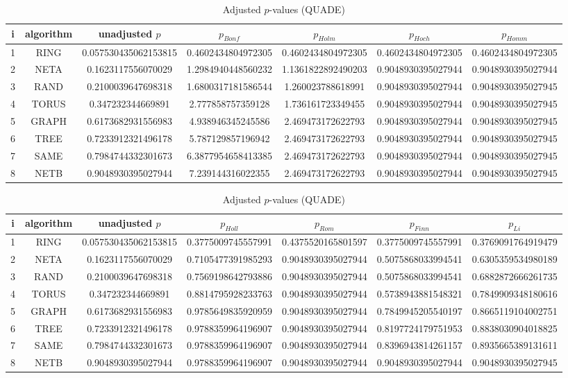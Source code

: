 \documentclass[a4paper,10pt]{article}
\begin{document}
\begin{landscape}
\newpage

\begin{table}[!htp]
\centering\scriptsize
\caption{Adjusted $p$-values (QUADE)}
\begin{tabular}{ccccccc}
i&algorithm&unadjusted $p$&$p_{Bonf}$&$p_{Holm}$&$p_{Hoch}$&$p_{Homm}$\\
\hline
1& RING&0.057530435062153815&0.4602434804972305&0.4602434804972305&0.4602434804972305&0.4602434804972305\\
2& NETA&0.1623117556070029&1.2984940448560232&1.1361822892490203&0.9048930395027944&0.9048930395027944\\
3& RAND&0.2100039647698318&1.6800317181586544&1.260023788618991&0.9048930395027944&0.9048930395027945\\
4& TORUS&0.347232344669891&2.777858757359128&1.736161723349455&0.9048930395027944&0.9048930395027945\\
5& GRAPH&0.6173682931556983&4.938946345245586&2.469473172622793&0.9048930395027944&0.9048930395027945\\
6& TREE&0.7233912321496178&5.787129857196942&2.469473172622793&0.9048930395027944&0.9048930395027945\\
7& SAME&0.7984744332301673&6.3877954658413385&2.469473172622793&0.9048930395027944&0.9048930395027945\\
8& NETB&0.9048930395027944&7.239144316022355&2.469473172622793&0.9048930395027944&0.9048930395027945\\
\hline
\end{tabular}
\end{table}

\begin{table}[!htp]
\centering\scriptsize
\caption{Adjusted $p$-values (QUADE)}
\begin{tabular}{ccccccc}
i&algorithm&unadjusted $p$&$p_{Holl}$&$p_{Rom}$&$p_{Finn}$&$p_{Li}$\\
\hline
1& RING&0.057530435062153815&0.3775009745557991&0.4375520165801597&0.3775009745557991&0.3769091764919479\\
2& NETA&0.1623117556070029&0.7105477391985293&0.9048930395027944&0.5075868033994541&0.6305359534980189\\
3& RAND&0.2100039647698318&0.7569198642793886&0.9048930395027944&0.5075868033994541&0.6882872666261735\\
4& TORUS&0.347232344669891&0.8814795928233763&0.9048930395027944&0.5738943881548321&0.7849909348180616\\
5& GRAPH&0.6173682931556983&0.9785649835920959&0.9048930395027944&0.7849945205540197&0.8665119104002751\\
6& TREE&0.7233912321496178&0.9788359964196907&0.9048930395027944&0.8197724179751953&0.8838030904018825\\
7& SAME&0.7984744332301673&0.9788359964196907&0.9048930395027944&0.8396943814261157&0.8935665389131611\\
8& NETB&0.9048930395027944&0.9788359964196907&0.9048930395027944&0.9048930395027944&0.9048930395027945\\
\hline
\end{tabular}
\end{table}

\end{landscape}
\end{document}
